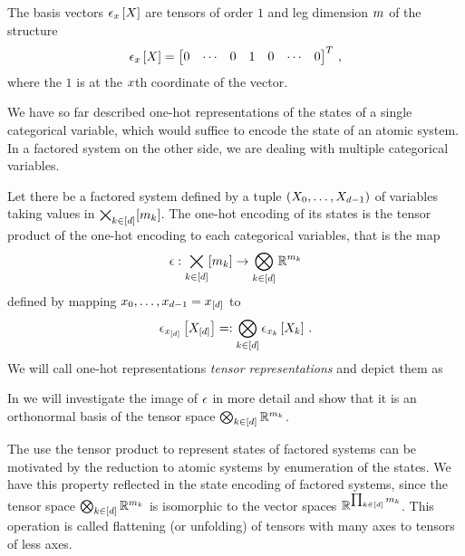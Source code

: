 The basis vectors $\epsilon_{x}\left[X\right]$ are tensors of order $1$ and leg dimension $m$ of the structure
\begin{align}
	\epsilon_{x}\left[X\right] = \begin{bmatrix}
	0 & \cdots & 0 & 1 & 0 & \cdots & 0
	\end{bmatrix}^T \, ,
\end{align}
where the $1$ is at the $x$th coordinate of the vector.

We have so far described one-hot representations of the states of a single categorical variable, which would suffice to encode the state of an atomic system.
In a factored system on the other side, we are dealing with multiple categorical variables.

\begin{definition}\label{def:oneHotEncoding}
	Let there be a factored system defined by a tuple $(X_{0},\ldots,X_{d-1})$ of variables taking values in $\bigtimes_{k\in[d]}[m_{k}]$.
	The one-hot encoding of its states is the tensor product of the one-hot encoding to each categorical variables, that is the map
		\[ \epsilon : \bigtimes_{k\in[d]}[m_{k}] \rightarrow  \bigotimes_{k\in[d]} \mathbb{R}^{m_{k}} \]
	defined by mapping $x_{0},\ldots,x_{d-1}=x_{[d]}$ to
	\begin{align*}
		 \epsilon_{x_{[d]}}\left[X_{[d]}\right]
		=: \bigotimes_{k\in[d]} \epsilon_{x_{k}}\left[X_{k}\right] \, .
	\end{align*}
	We will call one-hot representations \emph{tensor representations} and depict them as
	\begin{center}
		
	\end{center}
\end{definition}

In  we will investigate the image of $\epsilon$ in more detail and show that it is an orthonormal basis of the tensor space $\bigotimes_{k\in[d]} \mathbb{R}^{m_{k}}$.

\begin{remark}
	The use the tensor product to represent states of factored systems can be motivated by the reduction to atomic systems by enumeration of the states.
	We have this property reflected in the state encoding of factored systems, since the tensor space $\bigotimes_{k\in[d]} \mathbb{R}^{m_{k}}$ is isomorphic to the vector spaces $\mathbb{R}^{\prod_{k\in[d]}m_{k}}$.
	This operation is called flattening (or unfolding) of tensors with many axes to tensors of less axes.
\end{remark}

